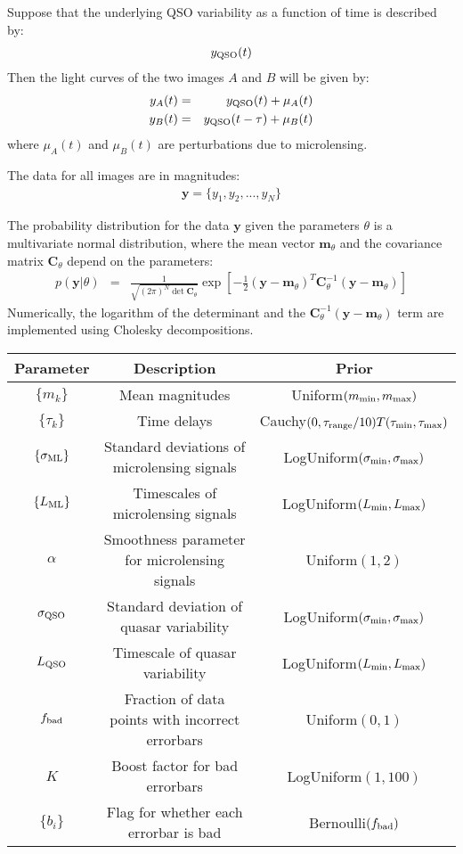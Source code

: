 \documentclass[a4paper, 10pt]{article}
\title{}
\author{}
\date{} %
\newcommand{\yy}{\mathbf{y}}
\newcommand{\mm}{\mathbf{m}_\theta}
\newcommand{\CC}{\mathbf{C}_\theta}
\begin{document}
Suppose that the underlying QSO variability as a function of time is
described by:
\begin{eqnarray}
y_{\rm QSO}(t)
\end{eqnarray}
Then the light curves of the two images $A$ and $B$ will be given by:
\begin{eqnarray}
y_A(t) &=& y_{\rm QSO}(t) + \mu_A(t)\\
y_B(t) &=& y_{\rm QSO}(t - \tau) + \mu_B(t)
\end{eqnarray}
where $\mu_A(t)$ and $\mu_B(t)$ are perturbations due to microlensing.


The data for all images are in magnitudes:
\begin{eqnarray}
\yy = \{y_1, y_2, ..., y_N\}
\end{eqnarray}


The probability distribution for the data $\yy$ given the parameters
$\theta$
is a multivariate normal distribution, where the mean vector $\mm$
and the covariance matrix $\CC$ depend on the parameters:
\begin{eqnarray}
p(\yy | \theta) &=& \frac{1}{\sqrt{(2\pi)^N\det{\CC}}}
\exp\left[
-\frac{1}{2}
\left(
\yy - \mm
\right)^T
\CC^{-1}
\left(
\yy - \mm
\right)
\right]
\end{eqnarray}
Numerically, the logarithm of the determinant and the
$\CC^{-1}\left(\yy - \mm\right)$ term are implemented using
Cholesky decompositions.

\begin{table}[h!]
\begin{center}
\begin{tabular}{|c|c|c|}
\hline
Parameter & Description & Prior\\
\hline
$\{m_k\}$ & Mean magnitudes & Uniform$(m_{\rm min}, m_{\rm max})$\\
$\{\tau_k\}$ & Time delays & Cauchy$(0, \tau_{\rm range}/10)T(\tau_{\rm min}, \tau_{\rm max})$\\
$\{\sigma_{\rm ML}\}$ & Standard deviations of microlensing signals & LogUniform$(\sigma_{\rm min}, \sigma_{\rm max})$\\
$\{L_{\rm ML}\}$ & Timescales of microlensing signals & LogUniform$(L_{\rm min}, L_{\rm max})$\\
$\alpha$ & Smoothness parameter for microlensing signals & Uniform$(1,2)$\\
$\sigma_{\rm QSO}$ & Standard deviation of quasar variability & LogUniform$(\sigma_{\rm min}, \sigma_{\rm max})$\\
$L_{\rm QSO}$ & Timescale of quasar variability & LogUniform$(L_{\rm min}, L_{\rm max})$\\
$f_{\rm bad}$ & Fraction of data points with incorrect errorbars & Uniform$(0,1)$\\
$K$ & Boost factor for bad errorbars & LogUniform$(1, 100)$\\
$\{b_i\}$ & Flag for whether each errorbar is bad & Bernoulli$(f_{\rm bad})$\\
\hline
\end{tabular}
\end{center}
\end{table}
\end{document}
